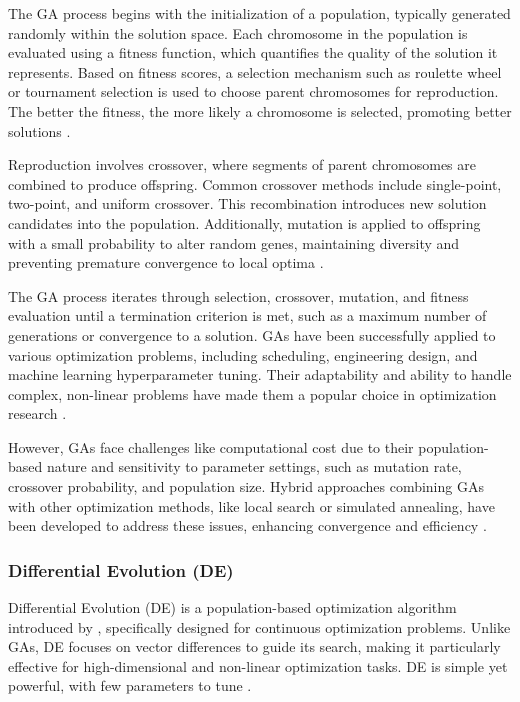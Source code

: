The GA process begins with the initialization of a population, typically generated randomly within the solution space. Each chromosome in the population is evaluated using a fitness function, which quantifies the quality of the solution it represents. Based on fitness scores, a selection mechanism such as roulette wheel or tournament selection is used to choose parent chromosomes for reproduction. The better the fitness, the more likely a chromosome is selected, promoting better solutions \parencite{Kawachi1992goldberg}.

Reproduction involves crossover, where segments of parent chromosomes are combined to produce offspring. Common crossover methods include single-point, two-point, and uniform crossover. This recombination introduces new solution candidates into the population. Additionally, mutation is applied to offspring with a small probability to alter random genes, maintaining diversity and preventing premature convergence to local optima \parencite{de1975analysis}.

The GA process iterates through selection, crossover, mutation, and fitness evaluation until a termination criterion is met, such as a maximum number of generations or convergence to a solution. GAs have been successfully applied to various optimization problems, including scheduling, engineering design, and machine learning hyperparameter tuning. Their adaptability and ability to handle complex, non-linear problems have made them a popular choice in optimization research \parencite{whitley1994genetic}.

However, GAs face challenges like computational cost due to their population-based nature and sensitivity to parameter settings, such as mutation rate, crossover probability, and population size. Hybrid approaches combining GAs with other optimization methods, like local search or simulated annealing, have been developed to address these issues, enhancing convergence and efficiency \parencite{michalewicz2013genetic}.

\subsubsection*{Differential Evolution (DE)}

Differential Evolution (DE) is a population-based optimization algorithm introduced by \textcite{storn1997differential}, specifically designed for continuous optimization problems. Unlike GAs, DE focuses on vector differences to guide its search, making it particularly effective for high-dimensional and non-linear optimization tasks. DE is simple yet powerful, with few parameters to tune \parencite{price2006differential}.

